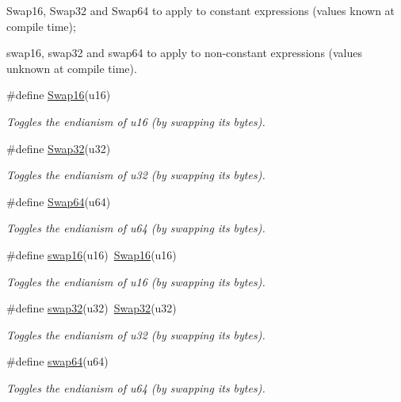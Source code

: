 \begin{DoxyItemize}
\item Swap16, Swap32 and Swap64 to apply to constant expressions (values known at compile time);
\item swap16, swap32 and swap64 to apply to non-\/constant expressions (values unknown at compile time). 
\end{DoxyItemize}\begin{DoxyCompactItemize}
\item 
\#define \hyperlink{group__group__xmega__utils_gadc9a009f53db3e7c3294ee6bc1027dca}{Swap16}(u16)
\begin{DoxyCompactList}\small\item\em Toggles the endianism of {\itshape u16} (by swapping its bytes). \end{DoxyCompactList}\item 
\#define \hyperlink{group__group__xmega__utils_ga5e9bc2e3b3e43eadc3210b02cab6ac64}{Swap32}(u32)
\begin{DoxyCompactList}\small\item\em Toggles the endianism of {\itshape u32} (by swapping its bytes). \end{DoxyCompactList}\item 
\#define \hyperlink{group__group__xmega__utils_ga33f3049d9b8374e8b93d5642bfe7f426}{Swap64}(u64)
\begin{DoxyCompactList}\small\item\em Toggles the endianism of {\itshape u64} (by swapping its bytes). \end{DoxyCompactList}\item 
\#define \hyperlink{group__group__xmega__utils_ga3067f71c33a89726a107430050253045}{swap16}(u16)~\hyperlink{group__group__xmega__utils_gadc9a009f53db3e7c3294ee6bc1027dca}{Swap16}(u16)
\begin{DoxyCompactList}\small\item\em Toggles the endianism of {\itshape u16} (by swapping its bytes). \end{DoxyCompactList}\item 
\#define \hyperlink{group__group__xmega__utils_ga46025d8a12ccc9f4268c84e56c457416}{swap32}(u32)~\hyperlink{group__group__xmega__utils_ga5e9bc2e3b3e43eadc3210b02cab6ac64}{Swap32}(u32)
\begin{DoxyCompactList}\small\item\em Toggles the endianism of {\itshape u32} (by swapping its bytes). \end{DoxyCompactList}\item 
\#define \hyperlink{group__group__xmega__utils_ga78484801bd5bea7d382b34a4ed1f345d}{swap64}(u64)
\begin{DoxyCompactList}\small\item\em Toggles the endianism of {\itshape u64} (by swapping its bytes). \end{DoxyCompactList}\end{DoxyCompactItemize}
